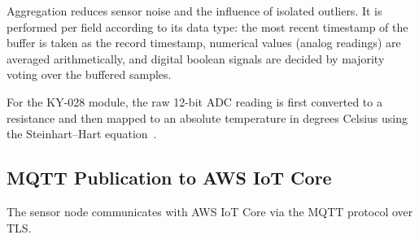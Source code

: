 Aggregation reduces sensor noise and the influence of isolated
outliers. It is performed per field according to its data type:
the most recent timestamp of the buffer is taken as the record
timestamp, numerical values (analog readings) are averaged
arithmetically, and digital boolean signals are decided by majority
voting over the buffered samples.





For the KY-028 module, the raw 12-bit ADC reading is first converted to a
resistance and then mapped to an absolute temperature in degrees Celsius
using the Steinhart--Hart equation~\cite{steinhart1968calibration}.

\subsection{MQTT Publication to AWS IoT Core}\label{sec:mqtt_publication}

The sensor node communicates with AWS IoT Core via the MQTT protocol over TLS.

